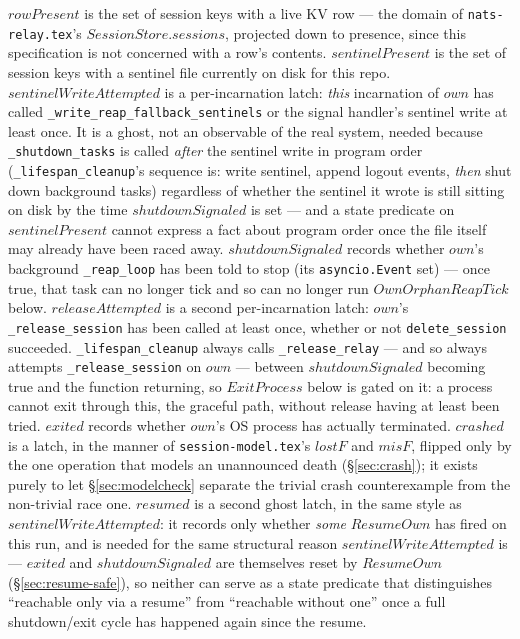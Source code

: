 \documentclass[a4paper,10pt,fleqn]{article}
\begin{document}
$rowPresent$ is the set of session keys with a live KV row --- the
domain of \texttt{nats-relay.tex}'s $SessionStore.sessions$, projected
down to presence, since this specification is not concerned with a
row's contents.  $sentinelPresent$ is the set of session keys with a
sentinel file currently on disk for this repo.  $sentinelWriteAttempted$
is a per-incarnation latch: \emph{this} incarnation of $own$ has called
\texttt{\_write\_reap\_fallback\_sentinels} or the signal handler's
sentinel write at least once.  It is a ghost, not an observable of the
real system, needed because \texttt{\_shutdown\_tasks} is called
\emph{after} the sentinel write in program order
(\texttt{\_lifespan\_cleanup}'s sequence is: write sentinel, append
logout events, \emph{then} shut down background tasks) regardless of
whether the sentinel it wrote is still sitting on disk by the time
$shutdownSignaled$ is set --- and a state predicate on
$sentinelPresent$ cannot express a fact about program order once the
file itself may already have been raced away.  $shutdownSignaled$
records whether $own$'s background \texttt{\_reap\_loop} has been told
to stop (its \texttt{asyncio.Event} set) --- once true, that task can no
longer tick and so can no longer run $OwnOrphanReapTick$ below.
$releaseAttempted$ is a second per-incarnation latch: $own$'s
\texttt{\_release\_session} has been called at least once, whether or
not \texttt{delete\_session} succeeded.  \texttt{\_lifespan\_cleanup}
always calls \texttt{\_release\_relay} --- and so always attempts
\texttt{\_release\_session} on $own$ --- between $shutdownSignaled$
becoming true and the function returning, so $ExitProcess$ below is
gated on it: a process cannot exit through this, the graceful path,
without release having at least been tried.  $exited$
records whether $own$'s OS process has actually terminated.  $crashed$
is a latch, in the manner of \texttt{session-model.tex}'s $lostF$ and
$misF$, flipped only by the one operation that models an unannounced
death (\S\ref{sec:crash}); it exists purely to let
\S\ref{sec:modelcheck} separate the trivial crash counterexample from
the non-trivial race one.  $resumed$ is a second ghost latch, in the
same style as $sentinelWriteAttempted$: it records only whether
\emph{some} $ResumeOwn$ has fired on this run, and is needed for the
same structural reason $sentinelWriteAttempted$ is --- $exited$ and
$shutdownSignaled$ are themselves reset by $ResumeOwn$
(\S\ref{sec:resume-safe}), so neither can serve as a state predicate
that distinguishes ``reachable only via a resume'' from ``reachable
without one'' once a full shutdown/exit cycle has happened again since
the resume.
\end{document}
